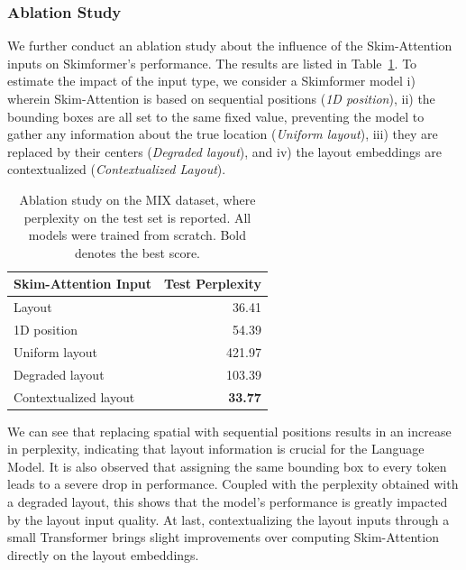 \subsubsection{Ablation Study}

We further conduct an ablation study about the influence of the Skim-Attention inputs on Skimformer's performance. The results are listed in Table~\ref{tab:chapter3-ablation-study}. To estimate the impact of the input type, we consider a Skimformer model i) wherein Skim-Attention is based on sequential positions (\textit{1D position}), ii) the bounding boxes are all set to the same fixed value, preventing the model to gather any information about the true location (\textit{Uniform layout}), iii) they are replaced by their centers (\textit{Degraded layout}), and iv) the layout embeddings are contextualized (\textit{Contextualized Layout}). 

\begin{table}[t]
\centering \small
\begin{tabular}{lr}
    \hline
    \textbf{Skim-Attention Input} & \textbf{Test Perplexity}\\
    \hline
    Layout                              & 36.41 \\
    1D position                         & 54.39 \\ 
    Uniform layout                      & 421.97 \\
    Degraded layout                     & 103.39 \\
    Contextualized layout               & \textbf{33.77} \\
    \hline
\end{tabular}
\caption{Ablation study on the MIX dataset, where perplexity on the test set is reported. All models were trained from scratch. Bold denotes the best score.}
\label{tab:chapter3-ablation-study}
\end{table}

We can see that replacing spatial with sequential positions results in an increase in perplexity, indicating that layout information is crucial for the Language Model. It is also observed that assigning the same bounding box to every token leads to a severe drop in performance. Coupled with the perplexity obtained with a degraded layout, this shows that the model's performance is greatly impacted by the layout input quality. At last, contextualizing the layout inputs through a small Transformer brings slight improvements over computing Skim-Attention directly on the layout embeddings.

